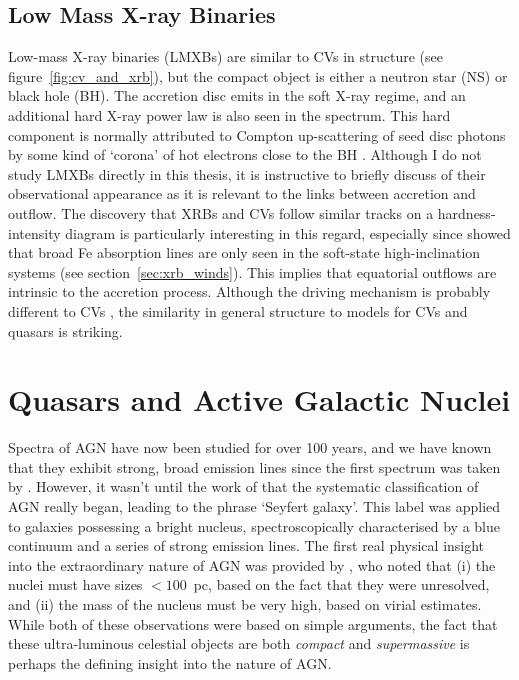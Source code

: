 \subsection{Low Mass X-ray Binaries}

Low-mass X-ray binaries (LMXBs) 
are similar to CVs in structure (see figure~\ref{fig:cv_and_xrb}), 
but the compact object
is either a neutron star (NS) or black hole (BH). The accretion disc 
emits in the soft X-ray regime, and an additional hard X-ray power law is also 
seen in the spectrum. This hard component is normally attributed
to Compton up-scattering of seed disc photons by some kind of `corona'
of hot electrons close to the BH \citep[e.g.][]{white1988,mitsuda1989,uttley2014}.
Although I do not study LMXBs directly in this thesis, it is instructive
to briefly discuss of their observational appearance as it is relevant to the links
between accretion and outflow. The discovery that XRBs and CVs follow similar 
tracks on a hardness-intensity diagram \citep[HID;][]{kordingDNjet2008}
is particularly interesting in this regard, especially since \cite{ponti2012}
showed that broad Fe absorption lines are only seen in the soft-state 
high-inclination systems (see section~\ref{sec:xrb_winds}). 
This implies that equatorial outflows are intrinsic to 
the accretion process. Although the driving mechanism
is probably different to CVs \citep[e.g.][]{diaztrigo2015}, 
the similarity in general structure to models for CVs and quasars is striking.




\section{Quasars and Active Galactic Nuclei}

Spectra of AGN have now been studied for over 100 years, and we have known 
that they exhibit strong, broad emission lines since the first spectrum was taken by
\cite{fath1909}. However, it wasn't until the work of \cite{seyfert1943} that the systematic 
classification of AGN really began, leading to the phrase `Seyfert galaxy'.
This label was applied to galaxies possessing a bright nucleus, spectroscopically
characterised by a blue continuum and a series of strong emission lines.
The first real physical insight into the extraordinary nature of AGN
was provided by \cite{woltjer1959}, who noted that 
(i) the nuclei must have sizes $<100$~pc,
based on the fact that they were unresolved, and (ii) the mass of the nucleus
must be very high, based on virial estimates. 
While both of these observations were based on simple arguments, the fact that these
ultra-luminous celestial objects are both {\em compact} and {\em supermassive}
is perhaps the defining insight into the nature of AGN.

